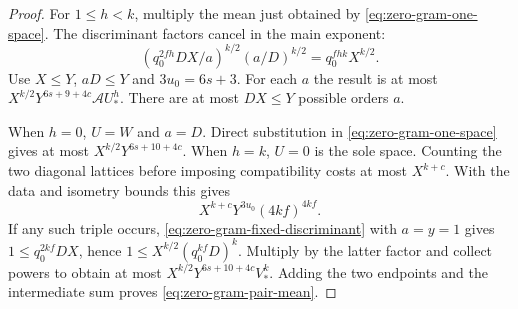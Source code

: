 \begin{proof}
For \(1\le h<k\), multiply the mean just obtained by
\eqref{eq:zero-gram-one-space}. The discriminant factors cancel
in the main exponent:
\[
  (q_0^{2fh}DX/a)^{k/2}(a/D)^{k/2}
         =q_0^{fhk}X^{k/2}.
\]
Use \(X\le Y\), \(aD\le Y\) and \(3u_0=6s+3\).
For each \(a\) the result is at most
\(X^{k/2}Y^{6s+9+4c}\mathcal A U_*^h\).
There are at most \(DX\le Y\) possible orders \(a\).

When \(h=0\), \(U=W\) and \(a=D\). Direct substitution in
\eqref{eq:zero-gram-one-space} gives at most
\(X^{k/2}Y^{6s+10+4c}\).
When \(h=k\), \(U=0\) is the sole space. Counting the two
diagonal lattices before imposing compatibility costs at most
\(X^{k+c}\). With the data and isometry bounds this gives
\[
       X^{k+c}Y^{3u_0}(4kf)^{4kf}.
\]
If any such triple occurs, \eqref{eq:zero-gram-fixed-discriminant}
with \(a=y=1\) gives \(1\le q_0^{2kf}DX\), hence
\(1\le X^{k/2}(q_0^{kf}D)^k\). Multiply by the latter factor
and collect powers to obtain at most
\(X^{k/2}Y^{6s+10+4c}V_*^k\). Adding the two endpoints and
the intermediate sum proves \eqref{eq:zero-gram-pair-mean}.
\end{proof}
